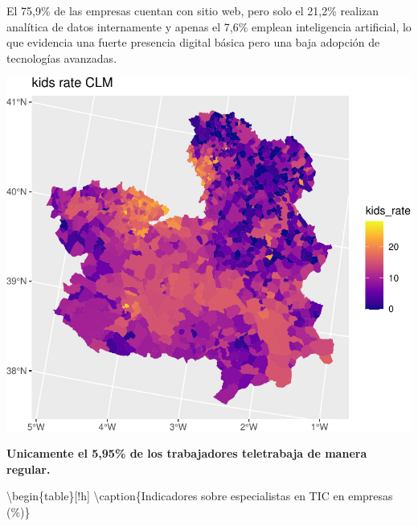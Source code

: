 \documentclass[
  10pt,
  a4paper,
  DIV=11,
  numbers=noendperiod]{scrreprt}
\begin{document}
El 75,9\% de las empresas cuentan con sitio web, pero solo el 21,2\%
realizan analítica de datos internamente y apenas el 7,6\% emplean
inteligencia artificial, lo que evidencia una fuerte presencia digital
básica pero una baja adopción de tecnologías avanzadas.

\includegraphics{clm01_ciencia_tecnologia_files/figure-pdf/unnamed-chunk-5-1.pdf}

\begin{tcolorbox}[enhanced jigsaw, leftrule=.75mm, breakable, toptitle=1mm, colframe=quarto-callout-note-color-frame, left=2mm, colback=white, bottomrule=.15mm, title=\textcolor{quarto-callout-note-color}{\faInfo}\hspace{0.5em}{Nota}, arc=.35mm, coltitle=black, colbacktitle=quarto-callout-note-color!10!white, toprule=.15mm, bottomtitle=1mm, opacityback=0, titlerule=0mm, rightrule=.15mm, opacitybacktitle=0.6]

\textbf{Unicamente el 5,95\% de los trabajadores teletrabaja de manera
regular.}

\end{tcolorbox}

\textbackslash begin\{table\}{[}!h{]} \centering
\textbackslash caption\{\label{tab:tabla-tic-especialistas}Indicadores
sobre especialistas en TIC en empresas (\%)\} \centering
\end{document}
